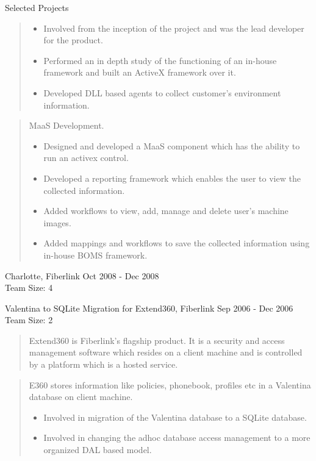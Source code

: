 \documentclass{resume}
\newcommand{\teamsize}{\\\sc\footnotesize Team Size: }
\begin{document}
\begin{category}{Selected Projects}{}
\begin{quote}
            \begin{itemize}
                \item Involved from the inception of the project and was the
                    lead developer for the product.
                \item Performed an in depth study of the functioning of an
                    in-house framework and built an ActiveX framework over it.
                \item Developed DLL based agents to collect customer’s
                    environment information.
            \end{itemize}
        \end{quote}
        \begin{quote}
            MaaS Development.
            \begin{itemize}
                \item Designed and developed a MaaS component which has the ability to run an activex control.
		\item Developed a reporting framework which enables the user to view the collected information.
		\item Added workflows to view, add, manage and delete user's machine images.
		\item Added mappings and workflows to save the collected information using in-house BOMS framework.
            \end{itemize}
        \end{quote}

    \pagebreak

    \item {\topic Charlotte,} Fiberlink
        {\period Oct 2008 - Dec 2008}
	{\teamsize 4}
        \begin{quote}
        \end{quote}

    \item {\topic Valentina to SQLite Migration for Extend360,} Fiberlink
        {\period Sep 2006 - Dec 2006}
        {\teamsize 2}
        \begin{quote}
            Extend360 is Fiberlink’s flagship product. It is a security and
            access management software which resides on a client machine and is
            controlled by a platform which is a hosted service.
        \end{quote}
        \begin{quote}
            E360 stores information like policies, phonebook, profiles etc in a
            Valentina database on client machine.
            \begin{itemize}
                \item Involved in migration of the Valentina database to a SQLite database.
                \item Involved in changing the adhoc database access management
                    to a more organized DAL based model.
            \end{itemize}
        \end{quote}


\end{category}
\end{document}
